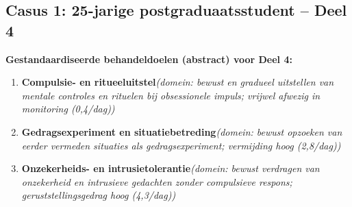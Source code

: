 \documentclass[11pt,a4paper]{article}
\begin{document}
\newpage
\subsection*{Casus 1: 25-jarige postgraduaatsstudent -- Deel 4}

\begin{contextbox}
\small\textbf{Gestandaardiseerde behandeldoelen (abstract) voor Deel 4:}
\begin{enumerate}[topsep=2pt,itemsep=1pt,label=\arabic*.]
\item \textbf{Compulsie- en ritueeluitstel}\quad\textit{\small (domein: bewust en gradueel uitstellen van mentale controles en rituelen bij obsessionele impuls; vrijwel afwezig in monitoring (0,4/dag))}
\item \textbf{Gedragsexperiment en situatiebetreding}\quad\textit{\small (domein: bewust opzoeken van eerder vermeden situaties als gedragsexperiment; vermijding hoog (2,8/dag))}
\item \textbf{Onzekerheids- en intrusietolerantie}\quad\textit{\small (domein: bewust verdragen van onzekerheid en intrusieve gedachten zonder compulsieve respons; geruststellingsgedrag hoog (4,3/dag))}
\end{enumerate}
\end{contextbox}
\end{document}
